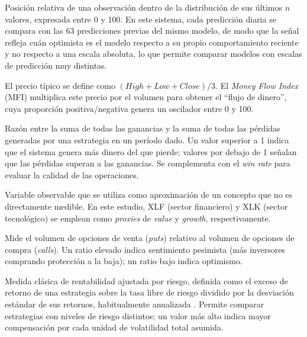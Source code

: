 \begin{description}[style=nextline, leftmargin=1.5cm]
\item[\hypertarget{glos:percentil_movil}{Percentil m\'ovil (\textit{rolling percentile})}]
Posici\'on relativa de una observaci\'on dentro de la distribuci\'on de sus \'ultimos $n$ valores, expresada entre 0 y 100. En este sistema, cada predicci\'on diaria se compara con las 63 predicciones previas del mismo modelo, de modo que la se\~nal refleja cu\'an optimista es el modelo respecto a su propio comportamiento reciente y no respecto a una escala absoluta, lo que permite comparar modelos con escalas de predicci\'on muy distintas.

\item[\hypertarget{glos:precio_tipico}{Precio t\'ipico / MFI}]
El precio t\'ipico se define como $(High + Low + Close) / 3$. El \textit{Money Flow Index} (MFI) multiplica este precio por el volumen para obtener el ``flujo de dinero'', cuya proporci\'on positiva/negativa genera un oscilador entre 0 y 100.

\item[\hypertarget{glos:profit_factor}{\textit{Profit factor}}]
Raz\'on entre la suma de todas las ganancias y la suma de todas las p\'erdidas generadas por una estrategia en un per\'iodo dado. Un valor superior a 1 indica que el sistema genera m\'as dinero del que pierde; valores por debajo de 1 se\~nalan que las p\'erdidas superan a las ganancias. Se complementa con el \textit{win rate} para evaluar la calidad de las operaciones.

\item[\hypertarget{glos:proxy}{\textit{Proxy}}]
Variable observable que se utiliza como aproximaci\'on de un concepto que no es directamente medible. En este estudio, XLF (sector financiero) y XLK (sector tecnol\'ogico) se emplean como \textit{proxies} de \textit{value} y \textit{growth}, respectivamente.

\item[\hypertarget{glos:put_call}{Ratio \textit{put/call}}]
Mide el volumen de opciones de venta (\textit{puts}) relativo al volumen de opciones de compra (\textit{calls}). Un ratio elevado indica sentimiento pesimista (m\'as inversores comprando protecci\'on a la baja); un ratio bajo indica optimismo.

\item[\hypertarget{glos:sharpe_ratio}{\textit{Sharpe Ratio}}]
Medida cl\'asica de rentabilidad ajustada por riesgo, definida como el exceso de retorno de una estrategia sobre la tasa libre de riesgo dividido por la desviaci\'on est\'andar de sus retornos, habitualmente anualizada \citep{sharpe1966mutual}. Permite comparar estrategias con niveles de riesgo distintos; un valor m\'as alto indica mayor compensaci\'on por cada unidad de volatilidad total asumida.


\end{description}
